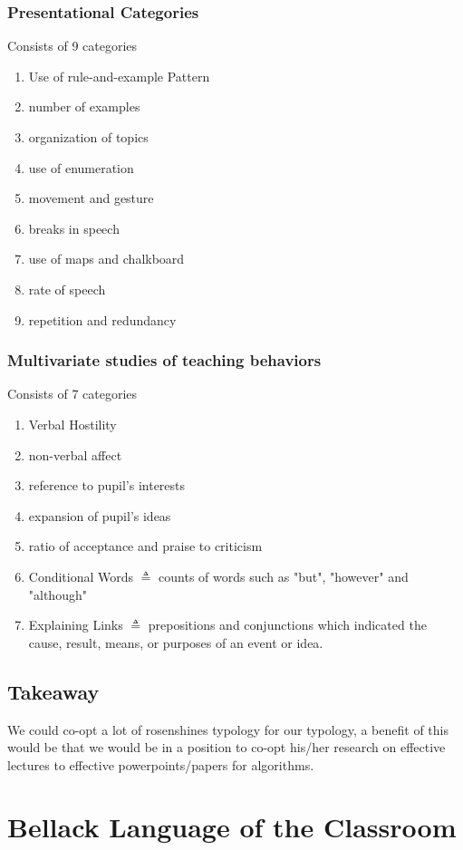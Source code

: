 \documentclass[10pt, letterpaper]{article}
\begin{document}
\subsubsection*{Presentational Categories}
\label{sec:org23007c4}
Consists of 9 categories
\begin{enumerate}
\item Use of rule-and-example Pattern
\item number of examples
\item organization of topics
\item use of enumeration
\item movement and gesture
\item breaks in speech
\item use of maps and chalkboard
\item rate of speech
\item repetition and redundancy
\end{enumerate}
\subsubsection*{Multivariate studies of teaching behaviors}
\label{sec:orgcbb2810}
Consists of 7 categories
\begin{enumerate}
\item Verbal Hostility
\item non-verbal affect
\item reference to pupil's interests
\item expansion of pupil's ideas
\item ratio of acceptance and praise to criticism
\item Conditional Words \(\triangleq\) counts of words such as "but", "however" and "although"
\item Explaining Links \(\triangleq\) prepositions and conjunctions which indicated the cause, result, means, or purposes of an event or idea.
\end{enumerate}

\subsection*{Takeaway}
\label{sec:orgf86c833}
We could co-opt a lot of rosenshines typology for our typology, a benefit of this would be that we would be in a position to co-opt his/her research on effective lectures to effective powerpoints/papers for algorithms.

\section*{Bellack Language of the Classroom}
\label{sec:orgf0b8de0}
\end{document}
